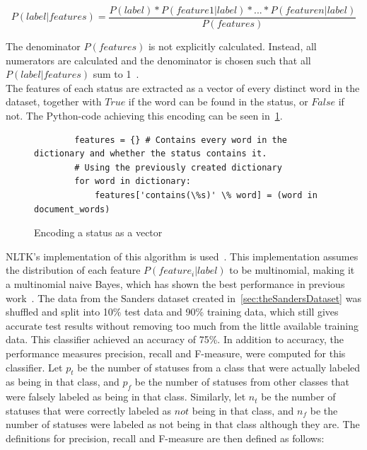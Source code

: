 \begin{equation}
    P(label|features) = \frac{P(label)*P(feature 1|label)*...*P(feature n|label)}{P(features)}
\end{equation}


The denominator $P(features)$ is not explicitly calculated.
Instead, all numerators are calculated and the denominator is chosen such that all $P(label|features)$ sum to 1~\cite{nltkDocs}.
\\
The features of each status are extracted as a vector of every distinct word in the dataset,
together with $True$ if the word can be found in the status, or $False$ if not.
The Python-code achieving this encoding can be seen in~\cref{code:extract_features}.

\begin{figure}
    \caption{Encoding a status as a vector}
    \label{code:extract_features}
    \begin{verbatim}
        features = {} # Contains every word in the dictionary and whether the status contains it.
        # Using the previously created dictionary
        for word in dictionary:
            features['contains(\%s)' \% word] = (word in document_words)
    \end{verbatim}
\end{figure}

NLTK's implementation of this algorithm is used~\cite{nltkDocs}.
This implementation assumes the distribution of each feature $P(feature_i|label)$ to be multinomial,
making it a multinomial naive Bayes, which has shown the best performance in previous work~\cite{Go2009}.
The data from the Sanders dataset created in~\cref{sec:theSandersDataset} was shuffled and split into 10\% test data and 90\% training data,
which still gives accurate test results without removing too much from the little available training data.
This classifier achieved an accuracy of 75\%.
In addition to accuracy, the performance measures precision, recall and F-measure, were computed for this classifier.
Let $p_t$ be the number of statuses from a class that were actually labeled as being in that class,
and $p_f$ be the number of statuses from other classes that were falsely labeled as being in that class.
Similarly, let $n_t$ be the number of statuses that were correctly labeled as $not$ being in that class,
and $n_f$ be the number of statuses were labeled as not being in that class although they are.
The definitions for precision, recall and F-measure are then defined as follows:

